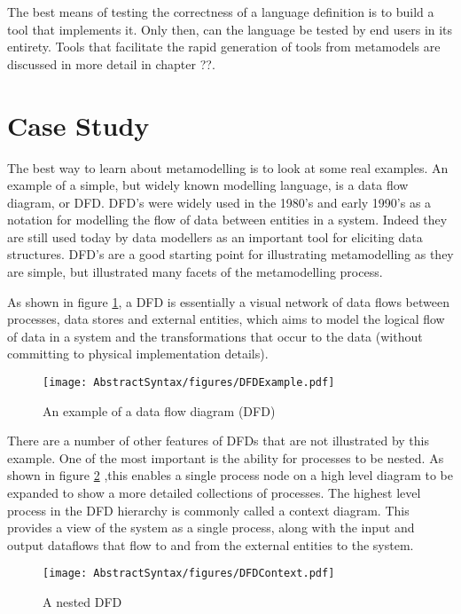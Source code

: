 The best means of testing the correctness of a language definition is to build a tool that implements it. Only then, can the language be tested by end users in its entirety. Tools that facilitate the rapid generation of tools from metamodels are discussed in more detail in chapter ??.

\section{Case Study}

The best way to learn about metamodelling is to look at some real examples. An example of a simple, but widely known modelling language, is a data flow diagram, or DFD. DFD's were widely used in the 1980's and early 1990's as a notation for modelling the flow of data between entities in a system. Indeed they are still used today by data modellers as an important tool for eliciting data structures. DFD's are a good starting point for illustrating metamodelling as they are simple, but illustrated many facets of the metamodelling process.

As shown in figure \ref{dfdexample}, a DFD is essentially a visual network of data flows between processes, data stores and external entities, which aims to model the logical flow of data in a system and the transformations that occur to the data (without committing to physical implementation details). 

\begin{figure}[htb]
\begin{center}
\texttt{[image: AbstractSyntax/figures/DFDExample.pdf]}
\caption{An example of a data flow diagram (DFD)}
\label{dfdexample}
\end{center}
\end{figure}

There are a number of other features of DFDs that are not illustrated by this example. One of the most important is the ability for processes to be nested. As shown in figure \ref{dfdnested} ,this enables a single process node on a high level diagram to be expanded to show a more detailed collections of processes. The highest level process in the DFD hierarchy is commonly called a context diagram. This provides a view of the system as a single process, along with the input and output dataflows that flow to and from the external entities to the system.

\begin{figure}[htb]
\begin{center}
\texttt{[image: AbstractSyntax/figures/DFDContext.pdf]}
\caption{A nested DFD}
\label{dfdnested}
\end{center}
\end{figure}

